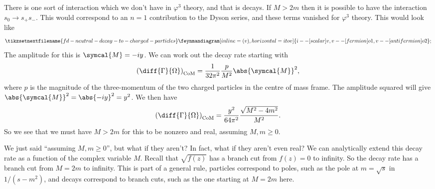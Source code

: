\documentclass[fleqn]{NotesClass}
\newcommand{\amplitude}{\symcal{M}}
\begin{document}
    There is one sort of interaction which we don't have in \(\varphi^3\) theory, and that is decays.
    If \(M > 2m\) then it is possible to have the interaction \(s_0 \to s_+s_-\).
    This would correspond to an \(n = 1\) contribution to the Dyson series, and these terms vanished for \(\varphi^3\) theory.
    This would look like
    \begin{equation}
        \tikzsetnextfilename{fd-neutral-decay-to-charged-particles}
        \feynmandiagram[inline=(v), horizontal=i to v]{
            i -- [scalar] v,
            v -- [fermion] o1,
            v -- [anti fermion] o2
        };
    \end{equation}
    The amplitude for this is \(\amplitude = -iy\).
    We can work out the decay rate starting with
    \begin{equation}
        \left( \diff{\Gamma}{\Omega} \right)_{\text{CoM}} = \frac{1}{32\pi^2} \frac{p}{M^2} \abs{\amplitude}^2,
    \end{equation}
    where \(p\) is the magnitude of the three-momentum of the two charged particles in the centre of mass frame.
    The amplitude squared will give \(\abs{\amplitude}^2 = \abs{-iy}^2 = y^2\).
    We then have
    \begin{equation}
        \left( \diff{\Gamma}{\Omega} \right)_{\text{CoM}} = \frac{y^2}{64\pi^2} \frac{\sqrt{M^2 - 4m^2}}{M^2}.
    \end{equation}
    So we see that we must have \(M > 2m\) for this to be nonzero and real, assuming \(M, m \ge 0\).
    
    We just said \enquote{assuming \(M, m \ge 0\)}, but what if they aren't?
    In fact, what if they aren't even real?
    We can analytically extend this decay rate as a function of the complex variable \(M\).
    Recall that \(\sqrt{f(z)}\) has a branch cut from \(f(z) = 0\) to infinity.
    So the decay rate has a branch cut from \(M = 2m\) to infinity.
    This is part of a general rule, particles correspond to poles, such as the pole at \(m = \sqrt{s}\) in \(1/(s - m^2)\), and decays correspond to branch cuts, such as the one starting at \(M = 2m\) here.
    
\end{document}
